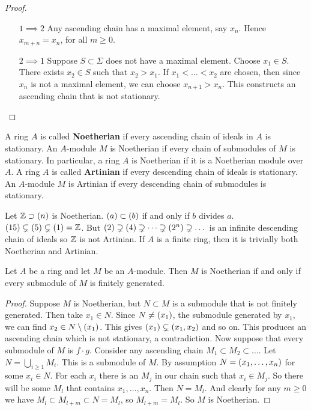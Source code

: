 \begin{proof}
\hfill
\begin{itemize}[leftmargin=0.5in]
\item[$ 1 \implies 2 $] Any ascending chain has a maximal element, say $ x_n $. Hence $ x_{m + n} = x_n $, for all $ m \ge 0 $.
\item[$ 2 \implies 1 $] Suppose $ S \subset \Sigma $ does not have a maximal element. Choose $ x_1 \in S $. There exists $ x_2 \in S $ such that $ x_2 > x_1 $. If $ x_1 < \dots < x_2 $ are chosen, then since $ x_n $ is not a maximal element, we can choose $ x_{n + 1} > x_n $. This constructs an ascending chain that is not stationary.
\end{itemize}
\end{proof}

\begin{definition}
A ring $ A $ is called \textbf{Noetherian} if every ascending chain of ideals in $ A $ is stationary. An $ A $-module $ M $ is Noetherian if every chain of submodules of $ M $ is stationary. In particular, a ring $ A $ is Noetherian if it is a Noetherian module over $ A $. A ring $ A $ is called \textbf{Artinian} if every descending chain of ideals is stationary. An $ A $-module $ M $ is Artinian if every descending chain of submodules is stationary.
\end{definition}

\begin{example*}
Let $ \Z \supset \br{n} $ is Noetherian. $ \br{a} \subset \br{b} $ if and only if $ b $ divides $ a $. $ \br{15} \subsetneq \br{5} \subsetneq \br{1} = \Z $. But $ \br{2} \supsetneq \br{4} \supsetneq \dots \supsetneq \br{2^n} \supsetneq \dots $ is an infinite descending chain of ideals so $ \mathbb{Z} $ is not Artinian. If $ A $ is a finite ring, then it is trivially both Noetherian and Artinian.
\end{example*}

\begin{proposition}
Let $ A $ be a ring and let $ M $ be an $ A $-module. Then $ M $ is Noetherian if and only if every submodule of $ M $ is finitely generated.
\end{proposition}

\begin{proof}
Suppose $ M $ is Noetherian, but $ N \subset M $ is a submodule that is not finitely generated. Then take $ x_1 \in N $. Since $ N \ne \br{x_1} $, the submodule generated by $ x_1 $, we can find $ x_2 \in N \setminus \br{x_1} $. This gives $ \br{x_1} \subsetneq \br{x_1, x_2} $ and so on. This produces an ascending chain which is not stationary, a contradiction. Now suppose that every submodule of $ M $ is $ f \cdot g $. Consider any ascending chain $ M_1 \subset M_2 \subset \dots $. Let $ N = \bigcup_{i \ge 1} M_i $. This is a submodule of $ M $. By assumption $ N = \br{x_1, \dots, x_n} $ for some $ x_i \in N $. For each $ x_i $ there is an $ M_j $ in our chain such that $ x_i \in M_j $. So there will be some $ M_l $ that contains $ x_1, \dots, x_n $. Then $ N = M_l $. And clearly for any $ m \ge 0 $ we have $ M_l \subset M_{l + m} \subset N = M_l $, so $ M_{l + m} = M_l $. So $ M $ is Noetherian.
\end{proof}

